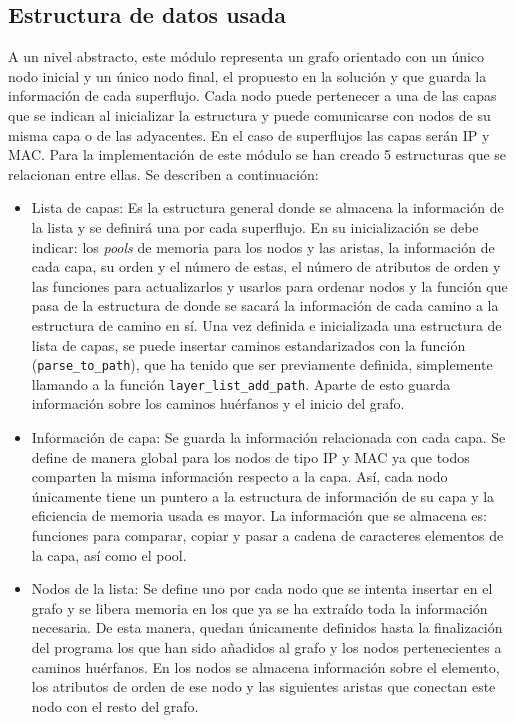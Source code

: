 \documentclass[tfg,epsbased,lof,lot,loa,covers,final,copyright,overleaf]{tfgtfmthesisuam}
\begin{document}
\subsection{Estructura de datos usada}

A un nivel abstracto, este módulo representa un grafo orientado con un único nodo inicial y un único nodo final, el propuesto en la solución y que guarda la información de cada superflujo. Cada nodo puede pertenecer a una de las capas que se indican al inicializar la estructura y puede comunicarse con nodos de su misma capa o de las adyacentes. En el caso de superflujos las capas serán IP y MAC. Para la implementación de este módulo se han creado 5 estructuras que se relacionan entre ellas. Se describen a continuación:

\begin{itemize}
    \item Lista de capas: Es la estructura general donde se almacena la información de la lista y se definirá una por cada superflujo. En su inicialización se debe indicar: los \textit{pools} de memoria para los nodos y las aristas, la información de cada capa, su orden y el número de estas, el número de atributos de orden y las funciones para actualizarlos y usarlos para ordenar nodos y la función que pasa de la estructura de donde se sacará la información de cada camino a la estructura de camino en sí. Una vez definida e inicializada una estructura de lista de capas, se puede insertar caminos estandarizados con la función (\texttt{parse\_to\_path}), que ha tenido que ser previamente definida, simplemente llamando a la función \texttt{layer\_list\_add\_path}. Aparte de esto guarda información sobre los caminos huérfanos y el inicio del grafo.
    \item Información de capa: Se guarda la información relacionada con cada capa. Se define de manera global para los nodos de tipo IP y MAC ya que todos comparten la misma información respecto a la capa. Así, cada nodo únicamente tiene un puntero a la estructura de información de su capa y la eficiencia de memoria usada es mayor. La información que se almacena es: funciones para comparar, copiar y pasar a cadena de caracteres elementos de la capa, así como el \gls{pool}.
    \item Nodos de la lista: Se define uno por cada nodo que se intenta insertar en el grafo y se libera memoria en los que ya se ha extraído toda la información necesaria. De esta manera, quedan únicamente definidos hasta la finalización del programa los que han sido añadidos al grafo y los nodos pertenecientes a caminos huérfanos.  En los nodos se almacena información sobre el elemento, los atributos de orden de ese nodo y las siguientes aristas que conectan este nodo con el resto del grafo.

\end{itemize}
\end{document}
